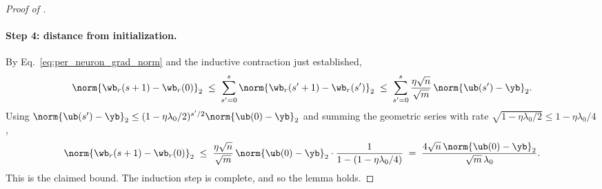 \begin{proof}[Proof of ]
\paragraph{Step 4: distance from initialization.}
By Eq.~\eqref{eq:per_neuron_grad_norm} and the inductive contraction just established,
\begin{align*}
\norm{\wb_r(s+1) - \wb_r(0)}_2
\;\le\; \sum_{s' = 0}^{s} \norm{\wb_r(s'+1) - \wb_r(s')}_2
\;\le\; \sum_{s' = 0}^{s} \frac{\eta \sqrt n}{\sqrt m} \, \norm{\ub(s') - \yb}_2.
\end{align*}
Using $\norm{\ub(s') - \yb}_2 \le (1 - \eta \lambda_0/2)^{s'/2} \norm{\ub(0) - \yb}_2$ and summing the geometric series with rate $\sqrt{1 - \eta \lambda_0/2} \le 1 - \eta \lambda_0/4$,
\begin{align*}
\norm{\wb_r(s+1) - \wb_r(0)}_2
\;\le\; \frac{\eta \sqrt n}{\sqrt m} \, \norm{\ub(0) - \yb}_2 \cdot \frac{1}{1 - (1 - \eta \lambda_0/4)}
\;=\; \frac{4 \sqrt n \, \norm{\ub(0) - \yb}_2}{\sqrt m \, \lambda_0}.
\end{align*}
This is the claimed bound. The induction step is complete, and so the lemma holds.
\end{proof}
